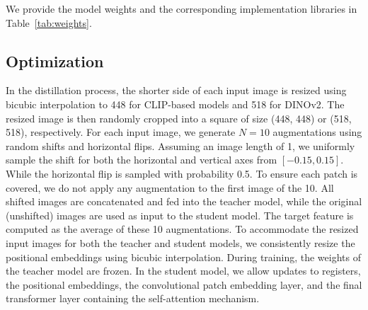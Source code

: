 \documentclass{article}
\begin{document}
\begin{table}[htbp]
\centering
\caption{\textbf{Model Implementation Libraries and Weights.} We compare models trained using different datasets and objectives.}
\vspace{.1cm}
\label{tab:weights}
\end{table}

We provide the model weights and the corresponding implementation libraries in Table~\ref{tab:weights}. 


\subsection{Optimization}
\label{opt}
In the distillation process, the shorter side of each input image is resized using bicubic interpolation to 448 for CLIP-based models and 518 for DINOv2. The resized image is then randomly cropped into a square of size (448, 448) or (518, 518), respectively. For each input image, we generate $N = 10$ augmentations using random shifts and horizontal flips. Assuming an image length of 1, we uniformly sample the shift for both the horizontal and vertical axes from $[-0.15, 0.15]$. While the horizontal flip is sampled with probability 0.5. To ensure each patch is covered, we do not apply any augmentation to the first image of the 10.  All shifted images are concatenated and fed into the teacher model, while the original (unshifted) images are used as input to the student model. The target feature is computed as the average of these 10 augmentations. To accommodate the resized input images for both the teacher and student models, we consistently resize the positional embeddings using bicubic interpolation. During training, the weights of the teacher model are frozen. In the student model, we allow updates to registers, the positional embeddings, the convolutional patch embedding layer, and the final transformer layer containing the self-attention mechanism.
\end{document}
